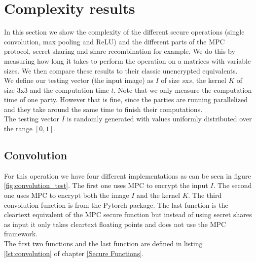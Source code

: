 \section{Complexity results}
In this section we show the complexity of the different secure operations (single convolution, max pooling and ReLU) and the different parts of the MPC protocol, secret sharing and share recombination for example. We do this by measuring how long it takes to perform the operation on a matrices with variable sizes. We then compare these results to their classic unencrypted equivalents.\\

We define our testing vector (the input image) as $I$ of size $s$x$s$, the kernel $K$ of size $3$x$3$ and the computation time $t$. Note that we only measure the computation time of one party. However that is fine, since the parties are running parallelized and they take around the same time to finish their computations.\\

The testing vector $I$ is randomly generated with values uniformly distributed over the range $[0,1]$.

\subsection{Convolution}
For this operation we have four different implementations as can be seen in figure \ref{fig:convolution_test}. The first one uses MPC to encrypt the input $I$. The second one uses MPC to encrypt both the image $I$ and the kernel $K$. The third convolution function is  from the Pytorch package. The last function is the cleartext equivalent of the MPC secure function but instead of using secret shares as input it only takes cleartext floating points and does not use the MPC framework.\\

The first two functions and the last function are defined in listing \ref{lst:convolution} of chapter \ref{Secure Functions}.

